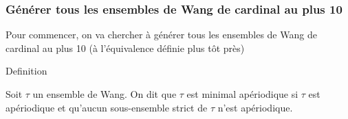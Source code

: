 \documentclass{beamer}
\begin{document}
\begin{frame}

\frametitle{Générer tous les ensembles de Wang de cardinal au plus 10}

Pour commencer, on va chercher à générer tous les ensembles de Wang de cardinal au plus 10 (à l'équivalence définie plus tôt près)

\begin{alertblock}{Definition}

Soit $\tau$ un ensemble de Wang. On dit que $\tau$ est minimal apériodique si $\tau$ est apériodique
et qu'aucun sous-ensemble strict de $\tau$ n'est apériodique.
    
\end{alertblock}
    
\end{frame}

\begin{frame}
\frametitle{}
\end{frame}
\end{document}
